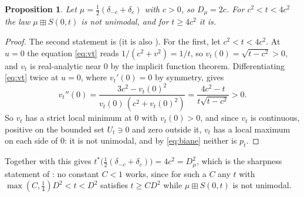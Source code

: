 \documentclass[11pt]{amsart}
\newtheorem{proposition}[theorem]{Proposition}
\theoremstyle{definition}
\newcommand{\bp}{\boxplus}
\begin{document}
\begin{proposition}\label{prop:sharp}
Let $\mu=\frac12(\delta_{-c}+\delta_c)$ with $c>0$, so $D_\mu=2c$. For $c^2<t<4c^2$ the law $\mu\bp S(0,t)$ is not unimodal, and for $t\ge4c^2$ it is.
\end{proposition}

\begin{proof}
The second statement is  (it is also \cite[Example 2.1]{HasebeUeda}). For the first, let $c^2<t<4c^2$. At $u=0$ the equation \eqref{eq:vt} reads $1/(c^2+v^2)=1/t$, so $v_t(0)=\sqrt{t-c^2}>0$, and $v_t$ is real-analytic near $0$ by the implicit function theorem. Differentiating \eqref{eq:vt} twice at $u=0$, where $v_t'(0)=0$ by symmetry, gives
\[
v_t''(0)=\frac{3c^2-v_t(0)^2}{v_t(0)\,(c^2+v_t(0)^2)}=\frac{4c^2-t}{t\sqrt{t-c^2}}>0 .
\]
So $v_t$ has a strict local minimum at $0$ with $v_t(0)>0$, and since $v_t$ is continuous, positive on the bounded set $U_t\ni 0$ and zero outside it, $v_t$ has a local maximum on each side of $0$: it is not unimodal, and by \eqref{eq:biane} neither is $p_t$.
\end{proof}

Together with  this gives $t^*\big(\frac12(\delta_{-c}+\delta_c)\big)=4c^2=D_\mu^2$, which is the sharpness statement of : no constant $C<1$ works, since for such a $C$ any $t$ with $\max(C,\tfrac14)D^2<t<D^2$ satisfies $t\ge CD^2$ while $\mu\bp S(0,t)$ is not unimodal.
\end{document}
